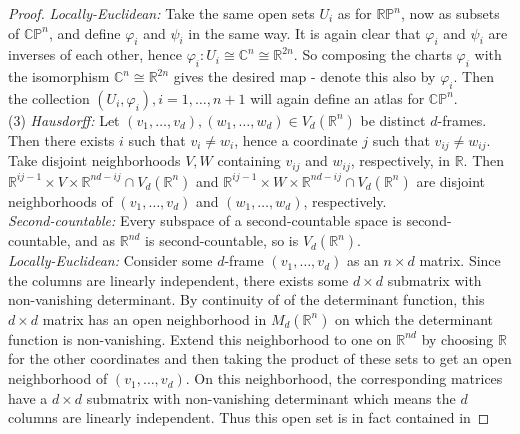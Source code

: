 \documentclass[reqno]{amsart}
\theoremstyle{definition}
\theoremstyle{remark}
\begin{document}
\begin{proof}
\textit{Locally-Euclidean:} Take the same
open sets $U_i$ as for $\mathbb{R}\mathbb{P}^{n}$, now
as subsets of $\mathbb{C}\mathbb{P}^{n}$, and define
$\varphi_i$ and $\psi_i$ in the same way. It is again
clear that $\varphi_i$ and $\psi_i$ are inverses of each
other, hence $\varphi_i \colon U_i \cong \mathbb{C}^{n}
\cong \mathbb{R}^{2n}$. So composing the charts
$\varphi_i$ with the isomorphism
$\mathbb{C}^{n} \cong \mathbb{R}^{2 n}$ gives
the desired map - denote this also by
$\varphi_i$. Then
the collection  $\left( U_i, \varphi_i \right),i
= 1,\ldots, n+1$ will
again define an atlas for $\mathbb{C}\mathbb{P}^{n}$.\\
\linebreak
(3) \textit{Hausdorff:} Let
$\left( v_1, \ldots, v_d \right),
\left( w_1, \ldots, w_d \right) \in V_d\left( \mathbb{R}^{n}
\right) $ be distinct $d$-frames.
Then there exists $i$ such that
$v_i \neq w_i$, hence a coordinate
$j$ such that $v_{ij} \neq w_{ij}$. Take
disjoint neighborhoods
$V,W$ containing $v_{ij}$ and $w_{ij}$, respectively,
in $\mathbb{R}$. Then
$\mathbb{R}^{ij-1} \times V \times 
\mathbb{R}^{nd-ij} \cap
V_d\left( \mathbb{R}^{n} \right) $ and
$\mathbb{R}^{ij-1} \times W \times 
\mathbb{R}^{nd-ij} 
\cap V_d\left( \mathbb{R}^{n} \right) $ are disjoint neighborhoods
of $\left( v_1, \ldots, v_d \right) $ and
$\left( w_1, \ldots, w_d \right) $, respectively.\\
\linebreak
\textit{Second-countable:}
Every subspace of a second-countable space is
second-countable, and as $\mathbb{R}^{nd}$ is
second-countable, so is $V_d \left( \mathbb{R}^{n} \right) $.\\
\linebreak
\textit{Locally-Euclidean:} 
Consider some $d$-frame $\left( v_1, \ldots, v_d \right) $ 
as an $n\times d$ matrix. Since the columns
are linearly independent, there
exists some $d\times d$ submatrix
with non-vanishing determinant. By continuity of
of the determinant function, this
$d \times d$ matrix has an open
neighborhood in $M_{d}\left( \mathbb{R}^{n} \right) $ 
on which the determinant function is non-vanishing. 
Extend this neighborhood to one
on $\mathbb{R}^{nd}$ by choosing
$\mathbb{R}$ for the other coordinates and then
taking the product of these sets to get an
open neighborhood of
$\left( v_1, \ldots, v_d \right) $.
On this neighborhood, the corresponding matrices 
have a $d \times d$ submatrix with non-vanishing determinant
which means the $d$ columns are linearly independent. Thus this
open set is in fact contained in

\end{proof}
\end{document}
